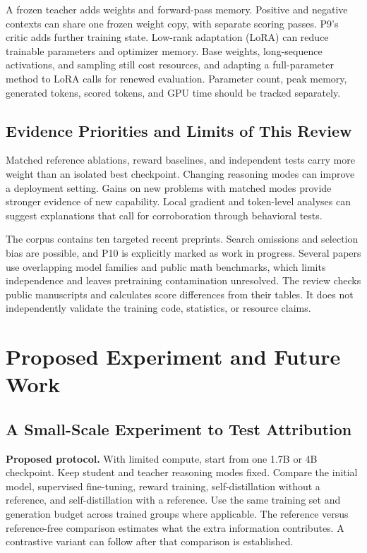\documentclass[11pt,a4paper]{article}
\begin{document}
A frozen teacher adds weights and forward-pass memory. Positive and negative contexts can share one frozen weight copy, with separate scoring passes. P9's critic adds further training state. Low-rank adaptation (LoRA) can reduce trainable parameters and optimizer memory. Base weights, long-sequence activations, and sampling still cost resources, and adapting a full-parameter method to LoRA calls for renewed evaluation. Parameter count, peak memory, generated tokens, scored tokens, and GPU time should be tracked separately.

\subsection{Evidence Priorities and Limits of This Review}
Matched reference ablations, reward baselines, and independent tests carry more weight than an isolated best checkpoint. Changing reasoning modes can improve a deployment setting. Gains on new problems with matched modes provide stronger evidence of new capability. Local gradient and token-level analyses can suggest explanations that call for corroboration through behavioral tests.

The corpus contains ten targeted recent preprints. Search omissions and selection bias are possible, and P10 is explicitly marked as work in progress. Several papers use overlapping model families and public math benchmarks, which limits independence and leaves pretraining contamination unresolved. The review checks public manuscripts and calculates score differences from their tables. It does not independently validate the training code, statistics, or resource claims.

\section{Proposed Experiment and Future Work}
\subsection{A Small-Scale Experiment to Test Attribution}
\textbf{Proposed protocol.} With limited compute, start from one 1.7B or 4B checkpoint. Keep student and teacher reasoning modes fixed. Compare the initial model, supervised fine-tuning, reward training, self-distillation without a reference, and self-distillation with a reference. Use the same training set and generation budget across trained groups where applicable. The reference versus reference-free comparison estimates what the extra information contributes. A contrastive variant can follow after that comparison is established.
\end{document}
